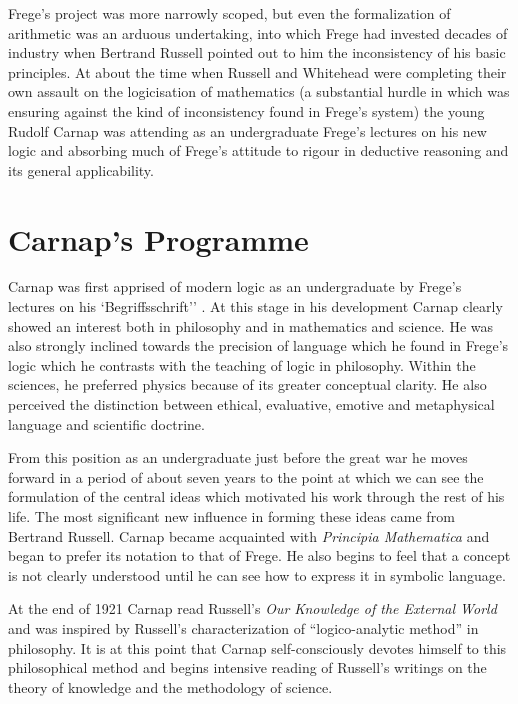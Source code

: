 Frege's project was more narrowly scoped, but even the formalization
of arithmetic was an arduous undertaking, into which Frege had
invested decades of industry when Bertrand Russell pointed out to him
the inconsistency of his basic principles. 
At about the time when Russell and Whitehead were completing their own
assault on the logicisation of mathematics (a substantial hurdle in
which was ensuring against the kind of inconsistency found in Frege's
system) the young Rudolf Carnap was attending as an undergraduate
Frege's lectures on his new logic and absorbing much of Frege's
attitude to rigour in deductive reasoning and its general
applicability. 

\section{Carnap's Programme}

Carnap was first apprised of modern logic as an undergraduate by
Frege's lectures on his `Begriffsschrift''
\cite{frege1879,heijenoort67}. 
At this stage in his development Carnap clearly showed an interest
both in philosophy and in mathematics and science. 
He was also strongly inclined towards the precision of language which
he found in Frege's logic which he contrasts with the teaching of
logic in philosophy. 
Within the sciences, he preferred physics because of its greater
conceptual clarity. 
He also perceived the distinction between ethical, evaluative, emotive
and metaphysical language and scientific doctrine. 

From this position as an undergraduate just before the great war he
moves forward in a period of about seven years to the point at which
we can see the formulation of the central ideas which motivated his
work through the rest of his life. 
The most significant new influence in forming these ideas came from
Bertrand Russell. 
Carnap became acquainted with \emph{Principia
  Mathematica}\cite{russell10} and began to prefer its notation to
that of Frege. 
He also begins to feel that a concept is not clearly understood until
he can see how to express it in symbolic language. 

At the end of 1921 Carnap read Russell's \emph{Our Knowledge of the
  External World}\cite{russell1921} and was inspired by Russell's
characterization of ``logico-analytic method'' in philosophy. 
It is at this point that Carnap self-consciously devotes himself to
this philosophical method and begins intensive reading of Russell's
writings on the theory of knowledge and the methodology of science. 

